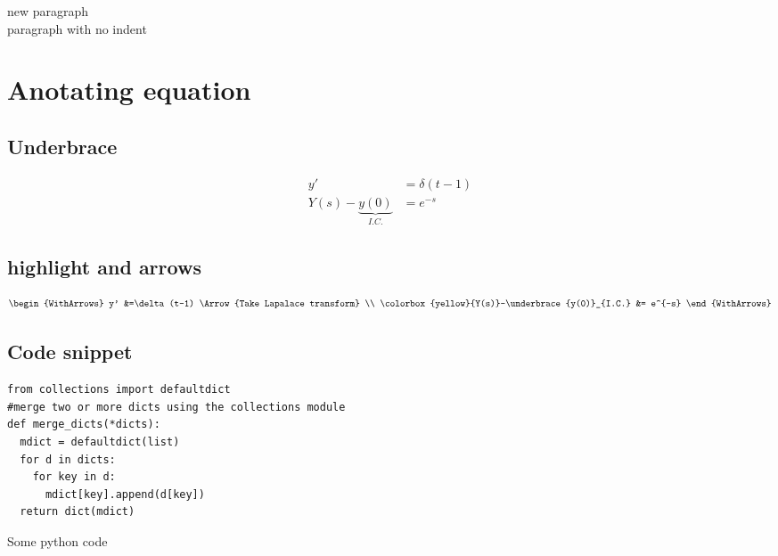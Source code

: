\documentclass{article}
\begin{document}
new paragraph\\

\noindent paragraph with no indent
\vfill
\lipsum[1]

\newpage

\section{Anotating equation}
\subsection{Underbrace}
\begin{align}
    y' &=\delta(t-1) \\
    Y(s)-\underbrace{y(0)}_{I.C.} &= e^{-s}
\end{align}

\subsection{highlight and arrows }

\[\begin{WithArrows}
    y' &=\delta(t-1) \Arrow{Take Lapalace transform} \\
    \colorbox{yellow}{Y(s)}-\underbrace{y(0)}_{I.C.} &= e^{-s}
\end{WithArrows}\]

\newpage
\subsection{Code snippet}
\begin{listing}
\begin{verbatim}
from collections import defaultdict
#merge two or more dicts using the collections module
def merge_dicts(*dicts):
  mdict = defaultdict(list)
  for d in dicts:
    for key in d:
      mdict[key].append(d[key])
  return dict(mdict)
\end{verbatim}
\caption{Some python code}
\end{listing}
\end{document}
